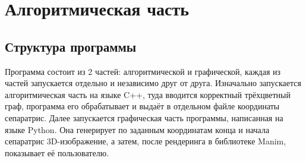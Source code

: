 	\section{Алгоритмическая часть}
	\subsection{Структура программы}
	Программа состоит из 2 частей: алгоритмической и графической, каждая из частей запускается отдельно и независимо друг от друга. Изначально запускается алгоритмическая часть на языке C++, туда вводится корректный трёхцветный граф, программа его обрабатывает и выдаёт в отдельном файле координаты сепаратрис. Далее запускается графическая часть программы, написанная на языке Python. Она генерирует по заданным координатам конца и начала сепаратрис 3D-изображение, а затем, после рендеринга в библиотеке Manim, показывает её пользователю.
